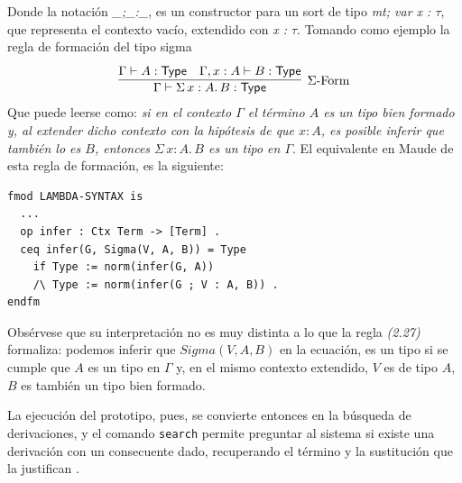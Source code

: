 \documentclass[a4paper,12pt]{report}
\theoremstyle{definition}
\theoremstyle{plain}
\theoremstyle{remark}
\newcommand{\Type}{\mathsf{Type}}
\begin{document}
Donde la notación \textit{\_;\_:\_}, es un constructor para un sort de tipo \textit{mt; var x : $\tau$}, que representa el contexto vacío, extendido con \textit{x : $\tau$}.
\newline
\newline
\indent Tomando como ejemplo la regla de formación del tipo sigma
\begin{gather}
  \infer[\text{$\Sigma$-Form}]
  {\Gamma \vdash \Sigma\, x : A.\, B : \Type}
  {\Gamma \vdash A : \Type
    & \deduce{\Gamma, x : A \vdash B : \Type}{}}
\end{gather}
Que puede leerse como: \textit{si en el contexto $\Gamma$ el t\'ermino $A$ es un tipo bien formado y, al extender dicho contexto con la hip\'otesis de que $x : A$, es posible inferir que también lo es $B$, entonces $\Sigma\, x : A.\, B$ es un tipo en $\Gamma$}. El equivalente en Maude de esta regla de formación, es la siguiente:

\begin{lstlisting}
fmod LAMBDA-SYNTAX is
  ...
  op infer : Ctx Term -> [Term] .
  ceq infer(G, Sigma(V, A, B)) = Type
    if Type := norm(infer(G, A))
    /\ Type := norm(infer(G ; V : A, B)) .
endfm
\end{lstlisting}

Obsérvese que su interpretación no es muy distinta a lo que la regla \textit{(2.27)} formaliza: podemos inferir que $Sigma(V, A, B)$ en la ecuación, es un tipo si se cumple que $A$ es un tipo en $\Gamma$ y, en el mismo contexto extendido, $V$ es de tipo $A$, $B$ es también un tipo bien formado.

La ejecución del prototipo, pues, se convierte entonces en la búsqueda de derivaciones, y el comando \texttt{search} permite preguntar al sistema si existe una derivación con un consecuente dado, recuperando el término y la sustitución que la justifican \citep{duran2019, clavel2007}.
\end{document}
